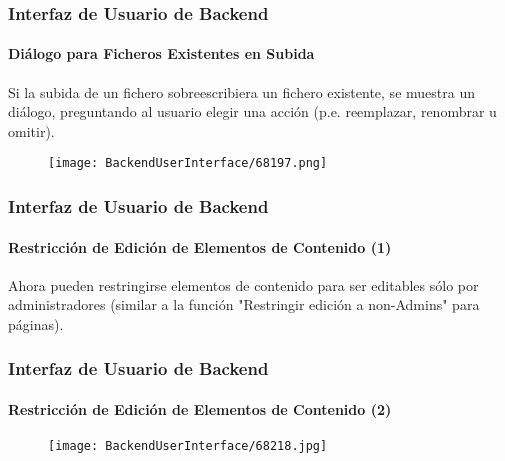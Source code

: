 \begin{frame}[fragile]
	\frametitle{Interfaz de Usuario de Backend}
	\framesubtitle{Diálogo para Ficheros Existentes en Subida}

	Si la subida de un fichero sobreescribiera un fichero existente, se muestra un diálogo, preguntando al usuario
	elegir una acción (p.e. reemplazar, renombrar u omitir).

	\begin{figure}
		\texttt{[image: BackendUserInterface/68197.png]}
	\end{figure}

\end{frame}


\begin{frame}[fragile]
	\frametitle{Interfaz de Usuario de Backend}
	\framesubtitle{Restricción de Edición de Elementos de Contenido (1)}

	Ahora pueden restringirse elementos de contenido para ser editables sólo por administradores
	(similar a la función "Restringir edición a non-Admins" para páginas).
\end{frame}

\begin{frame}[fragile]
	\frametitle{Interfaz de Usuario de Backend}
	\framesubtitle{Restricción de Edición de Elementos de Contenido (2)}

	\begin{figure}
		\texttt{[image: BackendUserInterface/68218.jpg]}
	\end{figure}

\end{frame}

